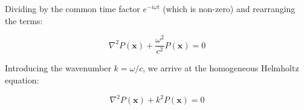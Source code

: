 Dividing by the common time factor $e^{-i \omega t}$ (which is non-zero) and rearranging the terms:

\begin{equation}
    \nabla^2 P(\mathbf{x}) + \frac{\omega^2}{c^2} P(\mathbf{x}) = 0
\end{equation}

Introducing the wavenumber $k = \omega / c$, we arrive at the homogeneous Helmholtz equation:

\begin{equation}
    \nabla^2 P(\mathbf{x}) + k^2 P(\mathbf{x}) = 0
    \label{eq:helmholtz}
\end{equation}